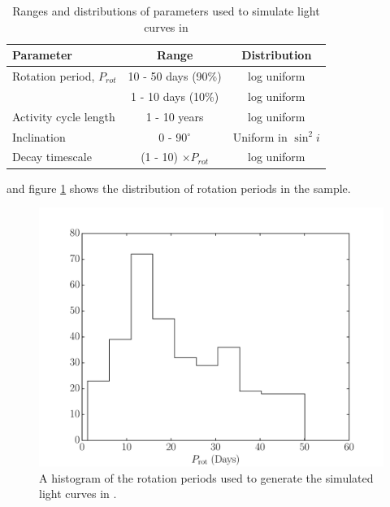 \documentclass[useAMS, usenatbib, preprint, 12pt]{aastex}
\begin{document}
\begin{table}
\begin{center}
\caption{Ranges and distributions of parameters used to simulate light curves
in \citet{aigrain2015}}
\begin{tabular}{lcc}
\hline\hline
    Parameter & Range & Distribution \\
    \hline
    Rotation period, $P_{rot}$ & 10 - 50 days (90\%) & log uniform \\
    & 1 - 10 days (10\%) & log uniform \\
    Activity cycle length & 1 - 10 years & log uniform \\
    Inclination & 0 - 90$^\circ$ & Uniform in $\sin^2i$ \\
    Decay timescale & (1 - 10) $\times P_{rot}$ & log uniform \\
\hline
\end{tabular}
\end{center}
\end{table}
\label{tab:simulation_parameters}

and figure \ref{fig:period_hist} shows the
distribution of rotation periods in the \citet{aigrain15} sample.
\begin{figure}
\begin{center}
\includegraphics[width=6in, clip=true]{figures/period_hist.pdf}
\caption{A histogram of the rotation periods used to generate the simulated
light curves in \citet{aigrain15}.}
\label{fig:period_hist}
\end{center}
\end{figure}
\end{document}
